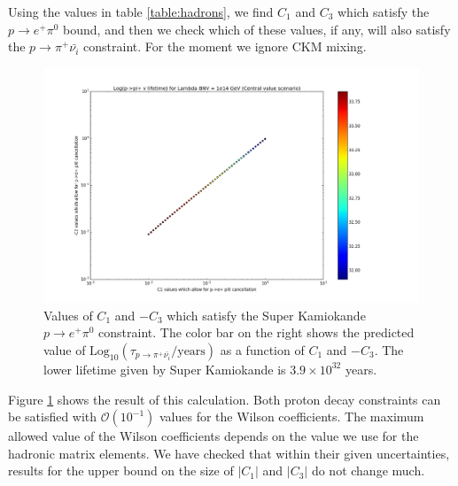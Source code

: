 \documentclass[aps,onecolumn,twoside,secnumarabic,balancelastpage,amsmath,amssymb,nofootinbib,hyperref=pdftex]{revtex4}
\begin{document}
 Using the values in table \ref{table:hadrons}, we find $C_{1}$ and $C_{3}$ which satisfy the $p \rightarrow e^{+}\pi^{0}$ bound, and then we check which of these values, if any, will also satisfy the $p\rightarrow \pi^{+}\bar{\nu_{i}}$ constraint. For the moment we ignore CKM mixing.


\begin{figure}[htbp]
\begin{center}
\includegraphics[width=18cm]{central_value.png}
\caption{Values of $C_1$ and $-C_3$ which satisfy the Super Kamiokande $p \rightarrow e^{+}\pi^{0}$ constraint. The color bar on the right shows the predicted value of $\text{Log}_{10}(\tau_{p\rightarrow \pi^{+}\bar{\nu_{i}}}/\text{years})$ as a function of $C_1$ and $-C_3$. The lower lifetime given by Super Kamiokande is $3.9\times10^{32}$ years.}
\label{figure:1}
\end{center}
\end{figure}

Figure \ref{figure:1} shows the result of this calculation. Both proton decay constraints can be satisfied with $\mathcal{O}(10^{-1})$ values for the Wilson coefficients. The maximum allowed value of the Wilson coefficients depends on the value we use for the hadronic matrix elements. We have checked that within their given uncertainties, results for the upper bound on the size of $|C_1|$ and $|C_3|$ do not change much. 
\end{document}

